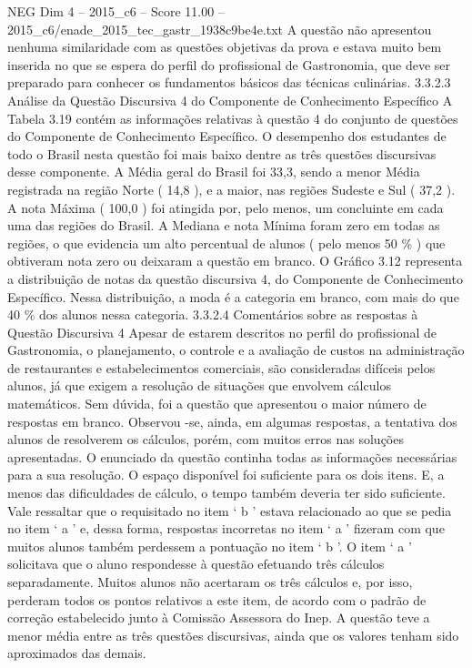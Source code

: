 \begin{textsample}{NEG Dim 4 – 2015\_c6 – Score 11.00 – 2015\_c6/enade\_2015\_tec\_gastr\_1938c9be4e.txt}
A questão não apresentou nenhuma similaridade com as questões objetivas da prova e estava muito bem inserida no que se espera do perfil do profissional de Gastronomia, que deve ser preparado para conhecer os fundamentos básicos das técnicas culinárias. 3.3.2.3 Análise da Questão Discursiva 4 do Componente de Conhecimento Específico A Tabela 3.19 contém as informações relativas à questão 4 do conjunto de questões do Componente de Conhecimento Específico.
O desempenho dos estudantes de todo o Brasil nesta questão foi mais baixo dentre as três questões discursivas desse componente.
A Média geral do Brasil foi 33,3, sendo a menor Média registrada na região Norte ( 14,8 ), e a maior, nas regiões Sudeste e Sul ( 37,2 ).
A nota Máxima ( 100,0 ) foi atingida por, pelo menos, um concluinte em cada uma das regiões do Brasil.
A Mediana e nota Mínima foram zero em todas as regiões, o que evidencia um alto percentual de alunos ( pelo menos 50 \% ) que obtiveram nota zero ou deixaram a questão em branco.
O Gráfico 3.12 representa a distribuição de notas da questão discursiva 4, do Componente de Conhecimento Específico.
Nessa distribuição, a moda é a categoria em branco, com mais do que 40 \% dos alunos nessa categoria. 3.3.2.4 Comentários sobre as respostas à Questão Discursiva 4 Apesar de estarem descritos no perfil do profissional de Gastronomia, o planejamento, o controle e a avaliação de custos na administração de restaurantes e estabelecimentos comerciais, são consideradas difíceis pelos alunos, já que exigem a resolução de situações que envolvem cálculos matemáticos.
Sem dúvida, foi a questão que apresentou o maior número de respostas em branco.
Observou -se, ainda, em algumas respostas, a tentativa dos alunos de resolverem os cálculos, porém, com muitos erros nas soluções apresentadas.
O enunciado da questão continha todas as informações necessárias para a sua resolução.
O espaço disponível foi suficiente para os dois itens.
E, a menos das dificuldades de cálculo, o tempo também deveria ter sido suficiente.
Vale ressaltar que o requisitado no item ‘ b ’ estava relacionado ao que se pedia no item ‘ a ’ e, dessa forma, respostas incorretas no item ‘ a ’ fizeram com que muitos alunos também perdessem a pontuação no item ‘ b ’.
O item ‘ a ’ solicitava que o aluno respondesse à questão efetuando três cálculos separadamente.
Muitos alunos não acertaram os três cálculos e, por isso, perderam todos os pontos relativos a este item, de acordo com o padrão de correção estabelecido junto à Comissão Assessora do Inep.
A questão teve a menor média entre as três questões discursivas, ainda que os valores tenham sido aproximados das demais.

\end{textsample}

